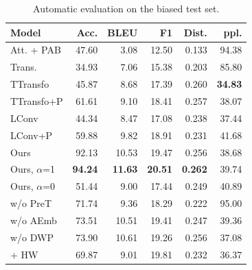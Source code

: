 \documentclass[letterpaper]{article} %
\begin{document}
\begin{table}[!t]
\centering
\caption{Automatic evaluation on the biased test set.}
\begin{tabular}{lrrrrr}
\toprule
Model             &  Acc.          &     BLEU       &    F1          &   Dist.        &    ppl.        \\ 
\midrule                                                                               
Att. + PAB        &   47.60        &     3.08       &     12.50      &   0.133        &    94.38       \\
Trans.            &   34.93        &     7.06       &     15.38      &   0.203        &    85.80       \\  
TTransfo          &   45.87        &     8.68       &     17.39      &   0.260        & \textbf{34.83} \\
TTransfo+P        &   61.61        &     9.10       &     18.41      &   0.257        &    38.07       \\
LConv             &   44.34        &     8.47       &     17.08      &   0.238        &    37.44       \\
LConv+P           &   59.88        &     9.82       &     18.91      &   0.231        &    41.68       \\
\midrule                                                                                          
Ours              &   92.13        &     10.53      &     19.47      &   0.256        &    38.68       \\  
Ours, $\alpha$=1  & \textbf{94.24} & \textbf{11.63} & \textbf{20.51} & \textbf{0.262} &    39.74       \\  
Ours, $\alpha$=0  &   51.44        &     9.00       &     17.44      &   0.249        &    40.89       \\  
w/o PreT          &   71.74        &     9.36       &     18.29      &   0.222        &    95.00       \\
w/o AEmb          &   73.51        &     10.51      &     19.41      &   0.247        &    39.36       \\
w/o DWP           &   73.90        &     10.61      &     19.26      &   0.256        &    37.08       \\
\quad + HW        &   69.87        &     9.01       &     19.81      &   0.232        &    36.37       \\
\bottomrule
\end{tabular}
\label{tab:bias_result}
\end{table}
\end{document}
